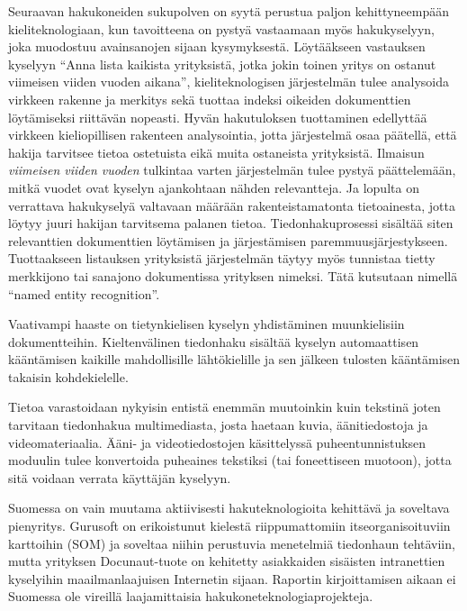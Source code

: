 \documentclass{../../metanetpaper}
\begin{document}
\begin{Parallel}[c]{79mm}{78mm}
{Seuraavan hakukoneiden sukupolven on syytä perustua paljon
kehittyneempään kieliteknologiaan, kun tavoitteena on
pystyä vastaamaan myös hakukyselyyn, joka muodostuu
avainsanojen sijaan kysymyksestä. Löytääkseen vastauksen kyselyyn “Anna lista 
kaikista yrityksistä, jotka jokin toinen yritys on ostanut viimeisen viiden vuoden aikana”,
kieliteknologisen järjestelmän tulee analysoida virkkeen rakenne ja merkitys 
sekä tuottaa indeksi oikeiden dokumenttien löytämiseksi riittävän nopeasti. 
Hyvän hakutuloksen tuottaminen edellyttää virkkeen kieliopillisen rakenteen
analysointia, jotta järjestelmä osaa päätellä, että hakija tarvitsee
tietoa ostetuista eikä muita ostaneista yrityksistä. Ilmaisun
\textit{viimeisen viiden vuoden} tulkintaa varten järjestelmän tulee
pystyä päättelemään, mitkä vuodet ovat kyselyn ajankohtaan nähden
relevantteja. Ja lopulta on verrattava hakukyselyä valtavaan määrään
rakenteistamatonta tietoainesta, jotta löytyy juuri hakijan tarvitsema palanen 
tietoa. Tiedonhakuprosessi sisältää siten relevanttien dokumenttien löytämisen ja 
järjestämisen paremmuusjärjestykseen. Tuottaakseen listauksen yrityksistä 
järjestelmän täytyy myös tunnistaa tietty merkkijono tai sana\-jono dokumentissa yrityksen
nimeksi. Tätä kutsutaan nimellä “named entity
recognition”.

Vaativampi haaste on tietynkielisen kyselyn yhdistäminen muunkielisiin
dokumentteihin. Kieltenvälinen tiedonhaku sisältää kyselyn
automaattisen kääntämisen kaikille mahdollisille lähtökielille ja sen
jälkeen tulosten kääntämisen takaisin kohdekielelle.

Tietoa varastoidaan nykyisin entistä enemmän muutoinkin kuin
tekstinä joten tarvitaan tiedonhakua multimediasta, josta haetaan kuvia, 
äänitiedostoja ja videomateriaalia. Ääni- ja videotiedostojen käsittelyssä 
puheentunnistuksen moduulin tulee konvertoida puheaines tekstiksi 
(tai foneettiseen muotoon), jotta sitä voidaan verrata käyttäjän kyselyyn.

Suomessa on vain muutama aktiivisesti hakuteknologioita kehittävä ja soveltava 
pienyritys. Gurusoft on erikoistunut kielestä riippumattomiin itseorganisoituviin 
karttoihin (SOM) ja soveltaa niihin perustuvia menetelmiä tiedonhaun tehtäviin, 
mutta yrityksen Docunaut-tuote on kehitetty asiakkaiden sisäisten intranettien kyselyihin
maailmanlaajuisen Internetin sijaan. Raportin kirjoittamisen aikaan ei
Suomessa ole vireillä laajamittaisia hakukoneteknologiaprojekteja.
}


\end{Parallel}
\end{document}
